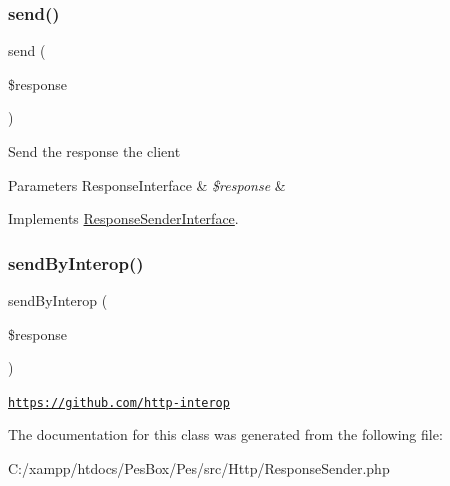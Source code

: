 \subsubsection{\texorpdfstring{send()}{send()}}
{\footnotesize\ttfamily send (\begin{DoxyParamCaption}\item[{Response\+Interface}]{\$response }\end{DoxyParamCaption})}

Send the response the client


\begin{DoxyParams}[1]{Parameters}
Response\+Interface & {\em \$response} & \\
\hline
\end{DoxyParams}


Implements \mbox{\hyperlink{interface_pes_1_1_http_1_1_response_sender_interface}{Response\+Sender\+Interface}}.

\mbox{\label{class_pes_1_1_http_1_1_response_sender_aefd3ad2cc7ad4a542aeda236f76b0e57}} 
\subsubsection{\texorpdfstring{send\+By\+Interop()}{sendByInterop()}}
{\footnotesize\ttfamily send\+By\+Interop (\begin{DoxyParamCaption}\item[{Response\+Interface}]{\$response }\end{DoxyParamCaption})}

\href{https://github.com/http-interop}{\tt https\+://github.\+com/http-\/interop} 

The documentation for this class was generated from the following file\+:\begin{DoxyCompactItemize}
\item 
C\+:/xampp/htdocs/\+Pes\+Box/\+Pes/src/\+Http/Response\+Sender.\+php\end{DoxyCompactItemize}
